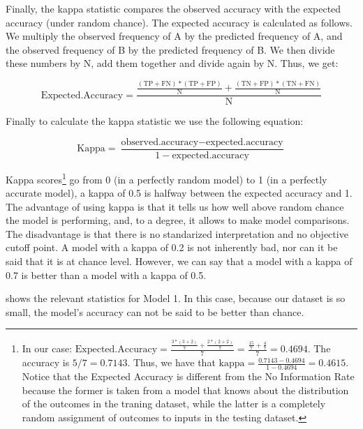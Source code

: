 Finally, the kappa statistic compares the observed accuracy with the expected accuracy (under random chance). The expected accuracy is calculated as follows. We multiply the observed frequency of A by the predicted frequency of A, and the observed frequency of B by the predicted frequency of B. We then divide these numbers by N, add them together and divide again by N. Thus, we get:


\begin{equation}
    \textrm{Expected.Accuracy}=\frac{\frac{(\textrm{TP}+\textrm{FN})*(\textrm{TP}+\textrm{FP})}{\textrm{N}} + \frac{(\textrm{TN}+\textrm{FP})*(\textrm{TN}+\textrm{FN})}{\textrm{N}}}{\textrm{N}}
\end{equation}

Finally to calculate the kappa statistic we use the following equation:

\begin{equation}
  \textrm{Kappa} = \frac{\textrm{observed.accuracy} - \textrm{expected.accuracy}}{1 - \textrm{expected.accuracy}}
\end{equation}


Kappa scores\footnote{In our case: $\textrm{Expected.Accuracy}=\frac{\frac{3*(3+2)}{7} + \frac{2*(2+2)}{7}}{7} = \frac{\frac{15}{7}+\frac{4}{7}}{7} = 0.4694$. The accuracy is $5/7=0.7143$. Thus, we have that $\textrm{kappa} = \frac{0.7143 - 0.4694}{1 - 0.4694}=0.4615$. Notice that the Expected Accuracy is different from the No Information Rate because the former is taken from a model that knows about the distribution of the outcomes in the traning dataset, while the latter is a completely random assignment of outcomes to inputs in the testing dataset.} go from 0 (in a perfectly random model) to 1 (in a perfectly accurate model), a kappa of 0.5 is halfway between the expected accuracy and 1. The advantage of using kappa is that it tells us how well above random chance the model is performing, and, to a degree, it allows to make model comparisons. The disadvantage is that there is no standarized interpretation and no objective cutoff point. A model with a kappa of 0.2 is not inherently bad, nor can it be said that it is at chance level. However, we can say that a model with a kappa of 0.7 is better than a model with a kappa of 0.5.

 shows the relevant statistics for Model 1. In this case, because our dataset is so small, the model's accuracy can not be said to be better than chance.

